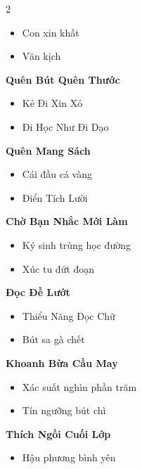 \begin{multicols}{2}
\begin{itemize}[leftmargin=1.2em, itemsep=0.1em, label=\textcolor{titlecolor}{\tiny$\blacksquare$}]
  \item Con xin khất
  \item Văn kịch
\end{itemize}
\vspace{0.8em}
\textbf{\color{chapterline}Quên Bút Quên Thước}
\begin{itemize}[leftmargin=1.2em, itemsep=0.1em, label=\textcolor{titlecolor}{\tiny$\blacksquare$}]
  \item Kẻ Đi Xin Xỏ
  \item Đi Học Như Đi Dạo
\end{itemize}
\vspace{0.8em}
\textbf{\color{chapterline}Quên Mang Sách}
\begin{itemize}[leftmargin=1.2em, itemsep=0.1em, label=\textcolor{titlecolor}{\tiny$\blacksquare$}]
  \item Cái đầu cá vàng
  \item Điển Tích Lười
\end{itemize}
\vspace{0.8em}
\textbf{\color{chapterline}Chờ Bạn Nhắc Mới Làm}
\begin{itemize}[leftmargin=1.2em, itemsep=0.1em, label=\textcolor{titlecolor}{\tiny$\blacksquare$}]
  \item Ký sinh trùng học đường
  \item Xúc tu đứt đoạn
\end{itemize}
\vspace{0.8em}
\textbf{\color{chapterline}Đọc Đề Lướt}
\begin{itemize}[leftmargin=1.2em, itemsep=0.1em, label=\textcolor{titlecolor}{\tiny$\blacksquare$}]
  \item Thiểu Năng Đọc Chữ
  \item Bút sa gà chết
\end{itemize}
\vspace{0.8em}
\textbf{\color{chapterline}Khoanh Bừa Cầu May}
\begin{itemize}[leftmargin=1.2em, itemsep=0.1em, label=\textcolor{titlecolor}{\tiny$\blacksquare$}]
  \item Xác suất nghìn phần trăm
  \item Tín ngưỡng bút chì
\end{itemize}
\vspace{0.8em}
\textbf{\color{chapterline}Thích Ngồi Cuối Lớp}
\begin{itemize}[leftmargin=1.2em, itemsep=0.1em, label=\textcolor{titlecolor}{\tiny$\blacksquare$}]
  \item Hậu phương bình yên

\end{itemize}
\end{multicols}
